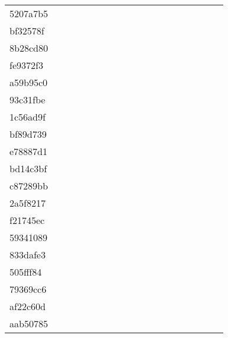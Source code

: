 \begin{table*}[htb]
\begin{tabular}{l|cccccccccccccccccc}
5207a7b5  & \C & \X & \X & \C & \X & \X & \C & \X & \X & \X & \C & \X & \C & \C & \C & \X & \X \\
bf32578f  & \C & \X & \X & \X & \X & \X & \X & \X & \X & \X & \X & \X & \X & \X & \C & \C & \C \\
8b28cd80  & \X & \X & \X & \X & \X & \X & \X & \X & \X & \X & \X & \X & \X & \X & \X & \X & \X \\
fe9372f3  & \C & \X & \X & \X & \X & \X & \X & \X & \X & \X & \X & \X & \X & \C & \C & \X & \X \\
a59b95c0  & \C & \X & \X & \X & \X & \C & \C & \C & \C & \C & \C & \X & \C & \C & \C & \C & \C \\
93c31fbe  & \C & \X & \X & \X & \X & \X & \X & \X & \X & \X & \X & \X & \X & \X & \X & \X & \X \\
1c56ad9f  & \C & \X & \X & \X & \X & \X & \X & \X & \X & \X & \X & \C & \C & \X & \C & \C & \C \\
bf89d739  & \C & \X & \X & \X & \X & \X & \X & \X & \X & \X & \X & \X & \C & \C & \C & \X & \X \\
e78887d1  & \C & \X & \X & \X & \X & \X & \X & \X & \X & \X & \X & \X & \X & \C & \C & \X & \X \\
bd14c3bf  & \C & \X & \X & \X & \X & \X & \X & \X & \X & \X & \X & \X & \X & \C & \C & \X & \X \\
c87289bb  & \C & \X & \X & \X & \X & \X & \X & \X & \X & \X & \X & \X & \X & \C & \C & \X & \X \\
2a5f8217  & \C & \X & \X & \X & \X & \X & \X & \X & \X & \X & \X & \X & \C & \C & \C & \X & \X \\
f21745ec  & \C & \X & \X & \X & \X & \X & \X & \X & \X & \X & \X & \X & \X & \C & \C & \X & \X \\
59341089  & \C & \X & \X & \X & \X & \X & \X & \C & \C & \X & \C & \C & \C & \C & \C & \C & \C \\
833dafe3  & \C & \X & \X & \X & \X & \X & \X & \C & \X & \C & \C & \C & \C & \C & \C & \C & \C \\
505fff84  & \C & \X & \C & \X & \X & \X & \X & \C & \C & \X & \C & \C & \C & \C & \C & \X & \C \\
79369cc6  & \C & \X & \X & \X & \X & \X & \X & \X & \X & \X & \X & \X & \X & \C & \C & \X & \X \\
af22c60d  & \C & \X & \X & \X & \X & \C & \C & \X & \X & \X & \X & \X & \X & \X & \C & \C & \X \\
aab50785  & \C & \X & \X & \X & \X & \X & \X & \C & \X & \X & \C & \C & \C & \C & \C & \X & \X \\

\end{tabular}
\end{table*}
